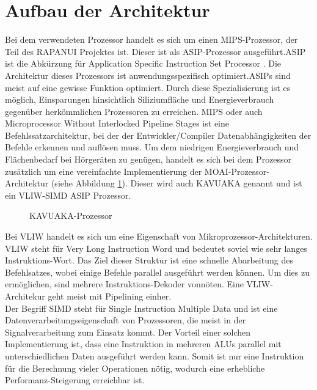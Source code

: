 \section{Aufbau der Architektur}
\label{chap:architecture_overview}
Bei dem verwendeten Prozessor handelt es sich um einen MIPS-Prozessor, der Teil des RAPANUI Projektes ist. Dieser ist als ASIP-Prozessor ausgeführt.ASIP ist die Abkürzung für \glqq Application Specific Instruction Set Processor \grqq. Die Architektur dieses Prozessors ist anwendungsspezifisch optimiert.ASIPs sind meist auf eine gewisse Funktion optimiert. Durch diese Spezialisierung ist es möglich, Einsparungen hinsichtlich Siliziumfläche und Energieverbrauch gegenüber herkömmlichen Prozessoren zu erreichen. MIPS oder auch \glqq Microprocessor Without Interlocked Pipeline Stages\grqq{} ist eine Befehlssatzarchitektur, bei der der Entwickler/Compiler Datenabhängigkeiten der Befehle erkennen und auflösen muss.
Um dem niedrigen Energieverbrauch und Flächenbedarf bei Hörgeräten zu genügen, handelt es sich bei dem Prozessor zusätzlich um eine vereinfachte Implementierung der MOAI-Prozessor-Architektur (siehe Abbildung \ref{fig:KAVUAKA}). Dieser wird auch KAVUAKA genannt und ist ein VLIW-SIMD ASIP Prozessor.\\
	\begin{figure}[H] 
		\centering
		
		\caption[KAVUAKA-Prozessor]{KAVUAKA-Prozessor \cite{lukasglitches2017}}
		\label{fig:KAVUAKA}
	\end{figure}
Bei VLIW  handelt es sich um eine Eigenschaft von Mikroprozessor-Architekturen. VLIW steht für \glqq Very Long Instruction Word \grqq und bedeutet soviel wie sehr langes Instruktions-Wort. Das Ziel dieser Struktur ist eine schnelle Abarbeitung des Befehlsatzes, wobei einige Befehle parallel ausgeführt werden können. Um dies zu ermöglichen, sind mehrere Instruktions-Dekoder vonnöten. Eine VLIW-Architekur geht meist mit Pipelining einher.\\
Der Begriff SIMD steht für \glqq Single Instruction Multiple Data \grqq und ist eine Datenverarbeitungseigenschaft von Prozessoren, die meist in der Signalverarbeitung zum Einsatz kommt. Der Vorteil einer solchen Implementierung ist, dass eine Instruktion in mehreren ALUs parallel mit unterschiedlichen Daten ausgeführt werden kann. Somit ist nur eine Instruktion für die Berechnung vieler Operationen nötig, wodurch eine erhebliche Performanz-Steigerung erreichbar ist.\cite[Seite 249]{wust2010mikroprozessortechnik}\\
